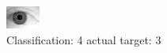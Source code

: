 \begin{figure}[h!]
\begin{center}
\includegraphics[width=0.60\columnwidth]{figures/ID2193_class_4_target_3.png}
\end{center}
\caption{ Classification: 4 actual target: 3}
\label{fig:ID2193_class_4_target_3}
\end{figure}

